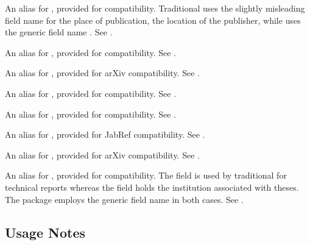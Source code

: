 \documentclass{ltxdockit}[2011/03/25]
\newcommand*{\biblatex}{\sty{biblatex}\xspace}
\begin{document}
\begin{fieldlist}


An alias for , provided for \bibtex compatibility. Traditional \bibtex uses the slightly misleading field name  for the place of publication, \ie the location of the publisher, while \biblatex uses the generic field name . See .


An alias for , provided for  compatibility. See .


An alias for , provided for arXiv compatibility. See . 


An alias for , provided for \bibtex compatibility. See .


An alias for , provided for \bibtex compatibility. See .


An alias for , provided for JabRef compatibility. See .


An alias for , provided for arXiv compatibility. See . 


An alias for , provided for \bibtex compatibility. The  field is used by traditional \bibtex for technical reports whereas the  field holds the institution associated with theses. The \biblatex package employs the generic field name  in both cases. See .

\end{fieldlist}

\subsection{Usage Notes}
\label{bib:use}
\end{document}
